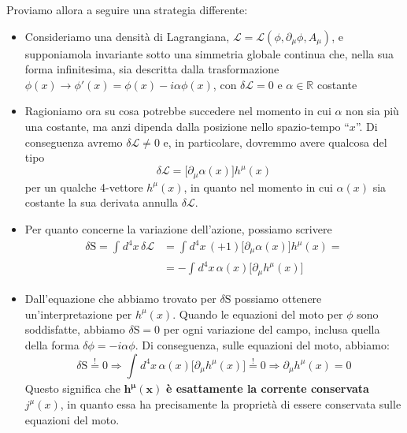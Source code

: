 \documentclass[../main.tex]{subfiles}
\begin{document}
Proviamo allora a seguire una strategia differente:
\begin{itemize}
    \item[\blacksquare] Consideriamo una densità di Lagrangiana, $\mathscr{L} = \mathscr{L}(\phi, \partial_\mu \phi, A_\mu)$, e supponiamola invariante sotto una simmetria globale continua che, nella sua forma infinitesima, sia descritta dalla trasformazione $\phi(x) \rightarrow \phi'(x)=\phi(x)-i\alpha\phi(x)$, con $\delta\mathscr{L} = 0$ e $\alpha\in\mathbb{R}$ costante
    
    \item[\blacksquare] Ragioniamo ora su cosa potrebbe succedere nel momento in cui $\alpha$ non sia più una costante, ma anzi dipenda dalla posizione nello spazio-tempo “$x$”. Di conseguenza avremo $\delta\mathscr{L} \neq 0$ e, in particolare, dovremmo avere qualcosa del tipo
    \[
    \delta\mathscr{L} = \big[\partial_\mu\alpha(x)\big]h^\mu(x)
    \]
    per un qualche 4-vettore $h^\mu(x)$, in quanto nel momento in cui $\alpha(x)$ sia costante la sua derivata annulla $\delta\mathscr{L}$.
    
    \item[\blacksquare] Per quanto concerne la variazione dell'azione, possiamo scrivere 
    \begin{align*}
        \delta \textrm{S} = \int_{}d^4x\,\delta\mathscr{L} &= \int_{}d^4x\, (+1)\big[\partial_\mu\alpha(x)\big]h^\mu(x) =\\
        &= -\int_{}d^4x\, \alpha(x)\big[\partial_\mu h^\mu(x)\big]
    \end{align*}
    
    \item[\blacksquare] Dall'equazione che abbiamo trovato per $\delta\textrm{S}$ possiamo ottenere un'interpretazione per $h^\mu(x)$. Quando le equazioni del moto per $\phi$ sono soddisfatte, abbiamo $\delta\textrm{S} = 0$ per ogni variazione del campo, inclusa quella della forma $\delta\phi = - i\alpha\phi$. Di conseguenza, sulle equazioni del moto, abbiamo:
    \[
    \delta\textrm{S} \overset{!}{=} 0 \Rightarrow \int_{}d^4x\, \alpha(x)\big[\partial_\mu h^\mu(x)\big]\overset{!}{=} 0 \Rightarrow \boxed{\partial_\mu h^\mu(x) = 0}
    \]
    Questo significa che $\mathbf{h^\mu(x)}$ \textbf{è esattamente la corrente conservata} $j^\mu(x)$, in quanto essa ha precisamente la proprietà di essere conservata sulle equazioni del moto.
    

\end{itemize}
\end{document}
